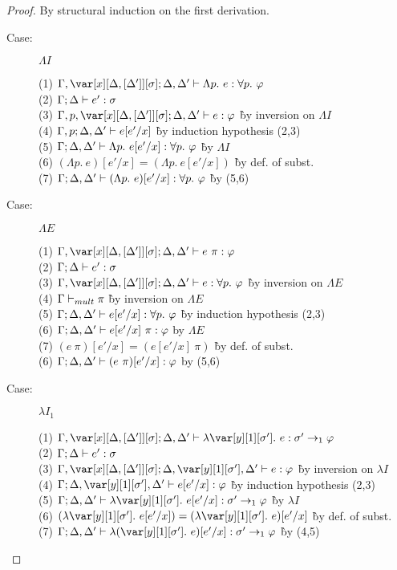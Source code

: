 \begin{proof}
By structural induction on the first derivation.

\begin{description}

\item[Case:] $\Lambda I$
\begin{tabbing}
    (1) $\G, \xD; \D, \D' \vdash \Lambda p.~e : \forall p.~\vp$\\
    (2) $\Gamma; \Delta \vdash e' : \sigma$\\
    (3) $\G, p, \xD; \D, \D' \vdash e : \vp$ \` by inversion on $\Lambda I$\\
    (4) $\Gamma, p; \Delta, \Delta' \vdash e[e'/x]$ \` by induction hypothesis (2,3)\\
    (5) $\Gamma; \Delta, \Delta' \vdash \Lambda p.~e[e'/x] : \forall p.~\varphi$ \` by $\Lambda I$ \\
    (6) $(\Lambda p.~e)[e'/x] = (\Lambda p.~e[e'/x])$ \` by def. of subst.\\
    (7) $\Gamma; \Delta, \Delta' \vdash (\Lambda p.~e)[e'/x] : \forall p.~\varphi$ \` by (5,6)\\
\end{tabbing}

\item[Case:] $\Lambda E$
\begin{tabbing}
    (1) $\G,\xD; \D,\D' \vdash e~\pi : \vp$\\
    (2) $\Gamma; \Delta \vdash e' : \sigma$\\
    (3) $\G,\xD; \D, \D' \vdash e : \forall p.~\vp$ \` by inversion on $\Lambda E$\\
    (4) $\Gamma \vdash_{mult} \pi$ \` by inversion on $\Lambda E$\\
    (5) $\Gamma; \Delta, \Delta' \vdash e[e'/x] : \forall p.~\varphi$ \` by induction hypothesis (2,3)\\
    (6) $\Gamma; \Delta, \Delta' \vdash e[e'/x]~\pi : \varphi$ by $\Lambda E$\\
    (7) $(e~\pi)[e'/x] = (e[e'/x]~\pi)$ \` by def. of subst.\\
    (6) $\Gamma; \Delta, \Delta' \vdash (e~\pi)[e'/x] : \varphi$ by (5,6)\\
\end{tabbing}

\item[Case:] $\lambda I_1$
\begin{tabbing}
    (1) $\G, \xD; \D, \D' \vdash \lambda \y[1][\s'].~e : \s' \to_1 \vp$\\
    (2) $\Gamma; \Delta \vdash e' : \sigma$\\
    (3) $\G, \xD; \D, \y[1][\s'], \D' \vdash e : \vp$ \` by inversion on $\lambda I$\\
    (4) $\G; \D, \y[1][\s'], \D' \vdash e[e'/x] : \vp$ \` by induction hypothesis (2,3)\\
    (5) $\G; \D, \D' \vdash \lambda \y[1][\s'].~e[e'/x] : \s' \to_1 \vp$ \` by $\lambda I$\\
    (6) $(\lambda \y[1][\s'].~e[e'/x]) = (\lambda \y[1][\s'].~e)[e'/x]$ \` by def. of subst.\\
    (7) $\G; \D, \D' \vdash \lambda (\y[1][\s'].~e)[e'/x] : \s' \to_1 \vp$ \` by (4,5)\\
\end{tabbing}


\end{description}
\end{proof}
